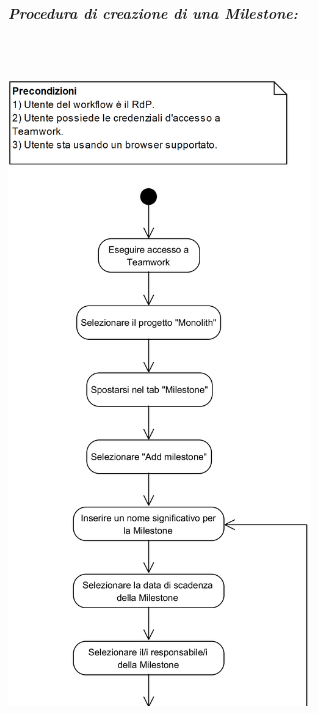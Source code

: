 \begin{samepage}
	\subparagraph{Procedura di creazione di una Milestone:}\mbox{}\\	
	\begin{center}
		\includegraphics[width=8cm]{../../documenti/NormeDiProgetto/DiagrammiProcedure/CreazioneMilestone1.png}
	\end{center}
\end{samepage}

